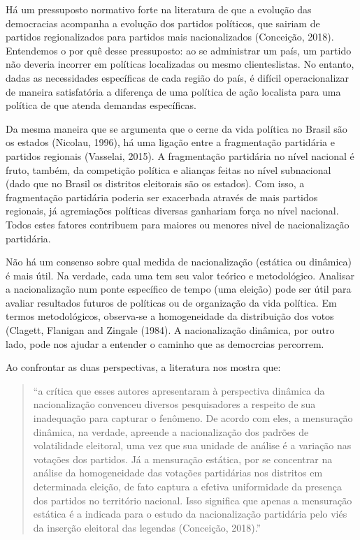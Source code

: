 \documentclass[]{article}
\begin{document}
Há um pressuposto normativo forte na literatura de que a evolução das
democracias acompanha a evolução dos partidos políticos, que sairiam de
partidos regionalizados para partidos mais nacionalizados (Conceição,
2018). Entendemos o por quê desse pressuposto: ao se administrar um
país, um partido não deveria incorrer em políticas localizadas ou mesmo
clienteslistas. No entanto, dadas as necessidades específicas de cada
região do país, é difícil operacionalizar de maneira satisfatória a
diferença de uma política de ação localista para uma política de que
atenda demandas específicas.

Da mesma maneira que se argumenta que o cerne da vida política no Brasil
são os estados (Nicolau, 1996), há uma ligação entre a fragmentação
partidária e partidos regionais (Vasselai, 2015). A fragmentação
partidária no nível nacional é fruto, também, da competição política e
alianças feitas no nível subnacional (dado que no Brasil os distritos
eleitorais são os estados). Com isso, a fragmentação partidária poderia
ser exacerbada através de mais partidos regionais, já agremiações
políticas diversas ganhariam força no nível nacional. Todos estes
fatores contribuem para maiores ou menores nivel de nacionalização
partidária.

Não há um consenso sobre qual medida de nacionalização (estática ou
dinâmica) é mais útil. Na verdade, cada uma tem seu valor teórico e
metodológico. Analisar a nacionalização num ponte específico de tempo
(uma eleição) pode ser útil para avaliar resultados futuros de políticas
ou de organização da vida política. Em termos metodológicos, observa-se
a homogeneidade da distribuição dos votos (Clagett, Flanigan and Zingale
(1984). A nacionalização dinâmica, por outro lado, pode nos ajudar a
entender o caminho que as democrcias percorrem.

Ao confrontar as duas perspectivas, a literatura nos mostra que:

\begin{quote}
``a crítica que esses autores apresentaram à perspectiva dinâmica da
nacionalização convenceu diversos pesquisadores a respeito de sua
inadequação para capturar o fenômeno. De acordo com eles, a mensuração
dinâmica, na verdade, apreende a nacionalização dos padrões de
volatilidade eleitoral, uma vez que sua unidade de análise é a variação
nas votações dos partidos. Já a mensuração estática, por se concentrar
na análise da homogeneidade das votações partidárias nos distritos em
determinada eleição, de fato captura a efetiva uniformidade da presença
dos partidos no território nacional. Isso significa que apenas a
mensuração estática é a indicada para o estudo da nacionalização
partidária pelo viés da inserção eleitoral das legendas (Conceição,
2018).''
\end{quote}
\end{document}
